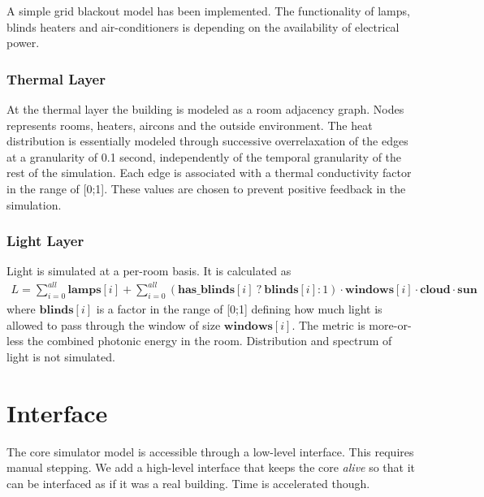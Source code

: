 \documentclass[10pt]{article}
\begin{document}
A simple grid blackout model has been implemented. The functionality of lamps, blinds heaters and air-conditioners is depending on the availability of electrical power.

\subsubsection{Thermal Layer}

At the thermal layer the building is modeled as a room adjacency graph. Nodes represents rooms, heaters, aircons and the outside environment. The heat distribution is essentially modeled through successive overrelaxation of the edges at a granularity of 0.1 second, independently of the temporal granularity of the rest of the simulation. Each edge is associated with a thermal conductivity factor in the range of [0;1]. These values are chosen to prevent positive feedback in the simulation.

\subsubsection{Light Layer}

Light is simulated at a per-room basis. It is calculated as
\begin{eqnarray}
  \nonumber L = \sum_{i=0}^{all} \mathbf{lamps}[i] + \sum_{i=0}^{all} \left(\mathbf{has\_blinds}[i] ~?~ \mathbf{blinds}[i] : 1\right) \cdot \mathbf{windows}[i] \cdot \mathbf{cloud} \cdot \mathbf{sun}
\end{eqnarray}
where $\mathbf{blinds}[i]$ is a factor in the range of [0;1] defining how much light is allowed to pass through the window of size $\mathbf{windows}[i]$. The metric is more-or-less the combined photonic energy in the room. Distribution and spectrum of light is not simulated.


\section{Interface}
\label{sec:interface}

The core simulator model is accessible through a low-level interface. This requires manual stepping. We add a high-level interface that keeps the core \textsl{alive} so that it can be interfaced as if it was a real building. Time is accelerated though.
\end{document}

